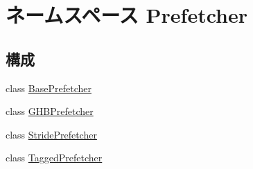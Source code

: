 \hypertarget{namespacePrefetcher}{
\section{ネームスペース Prefetcher}
\label{namespacePrefetcher}
}
\subsection*{構成}
\begin{DoxyCompactItemize}
\item 
class \hyperlink{classPrefetcher_1_1BasePrefetcher}{BasePrefetcher}
\item 
class \hyperlink{classPrefetcher_1_1GHBPrefetcher}{GHBPrefetcher}
\item 
class \hyperlink{classPrefetcher_1_1StridePrefetcher}{StridePrefetcher}
\item 
class \hyperlink{classPrefetcher_1_1TaggedPrefetcher}{TaggedPrefetcher}
\end{DoxyCompactItemize}
